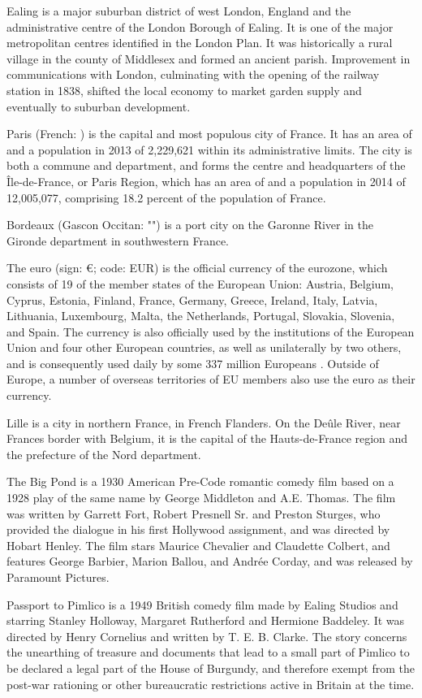 \documentclass{article} \usepackage{iclr2019_conference,times}
\begin{document}
Ealing is a major suburban district of west London, England and the administrative centre of the London Borough of Ealing. It is one of the major metropolitan centres identified in the London Plan. It was historically a rural village in the county of Middlesex and formed an ancient parish. Improvement in communications with London, culminating with the opening of the railway station in 1838, shifted the local economy to market garden supply and eventually to suburban development.

Paris (French: ) is the capital and most populous city of France. It has an area of and a population in 2013 of 2,229,621 within its administrative limits. The city is both a commune and department, and forms the centre and headquarters of the Île-de-France, or Paris Region, which has an area of and a population in 2014 of 12,005,077, comprising 18.2 percent of the population of France.

Bordeaux (Gascon Occitan: "") is a port city on the Garonne River in the Gironde department in southwestern France.

The euro (sign: €; code: EUR) is the official currency of the eurozone, which consists of 19 of the member states of the European Union: Austria, Belgium, Cyprus, Estonia, Finland, France, Germany, Greece, Ireland, Italy, Latvia, Lithuania, Luxembourg, Malta, the Netherlands, Portugal, Slovakia, Slovenia, and Spain. The currency is also officially used by the institutions of the European Union and four other European countries, as well as unilaterally by two others, and is consequently used daily by some 337 million Europeans . Outside of Europe, a number of overseas territories of EU members also use the euro as their currency.

Lille  is a city in northern France, in French Flanders. On the Deûle River, near Frances border with Belgium, it is the capital of the Hauts-de-France region and the prefecture of the Nord department.

The Big Pond is a 1930 American Pre-Code romantic comedy film based on a 1928 play of the same name by George Middleton and A.E. Thomas. The film was written by Garrett Fort, Robert Presnell Sr. and Preston Sturges, who provided the dialogue in his first Hollywood assignment, and was directed by Hobart Henley. The film stars Maurice Chevalier and Claudette Colbert, and features George Barbier, Marion Ballou, and Andrée Corday, and was released by Paramount Pictures.

Passport to Pimlico is a 1949 British comedy film made by Ealing Studios and starring Stanley Holloway, Margaret Rutherford and Hermione Baddeley. It was directed by Henry Cornelius and written by T. E. B. Clarke. The story concerns the unearthing of treasure and documents that lead to a small part of Pimlico to be declared a legal part of the House of Burgundy, and therefore exempt from the post-war rationing or other bureaucratic restrictions active in Britain at the time.
\end{document}
